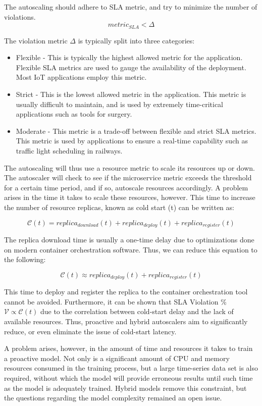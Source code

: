The autoscaling should adhere to SLA metric, and try to minimize the number of violations.
\[ metric_{SLA} < \Delta \]

The violation metric $\Delta$ is typically split into three categories:
\begin{itemize}
    \item Flexible - This is typically the highest allowed metric for the application. Flexible SLA metrics are used to gauge the availability of the deployment. Most IoT applications employ this metric.
    \item Strict - This is the lowest allowed metric in the application. This metric is usually difficult to maintain, and is used by extremely time-critical applications such as tools for surgery.
    \item Moderate - This metric is a trade-off between flexible and strict SLA metrics. This metric is used by applications to ensure a real-time capability such as traffic light scheduling in railways.
\end{itemize}

The autoscaling will thus use a resource metric to scale its resources up or down. The autoscaler will check to see if the microservice metric exceeds the threshold for a certain time period, and if so, autoscale resources accordingly. A problem arises in the time it takes to scale these resources, however. This time to increase the number of resource replicas, known as cold start (t) can be written as:

\[ \mathcal{C}(t) = replica_{download}(t) + replica_{deploy}(t) + replica_{register}(t)\]

The replica download time is usually a one-time delay due to optimizations done on modern container orchestration software. Thus, we can reduce this equation to the following:

\[ \mathcal{C}(t) \approx replica_{deploy}(t) + replica_{register}(t)\]

This time to deploy and register the replica to the container orchestration tool cannot be avoided. Furthermore, it can be shown that SLA Violation \% $\mathcal{V} \propto \mathcal{C}(t)$ due to the correlation between cold-start delay and the lack of available resources. Thus, proactive and hybrid autoscalers aim to significantly reduce, or even eliminate the issue of cold-start latency.\par

A problem arises, however, in the amount of time and resources it takes to train a proactive model. Not only is a significant amount of CPU and memory resources consumed in the training process, but a large time-series data set is also required, without which the model will provide erroneous results until such time as the model is adequately trained. Hybrid models remove this constraint, but the questions regarding the model complexity remained an open issue.\par

